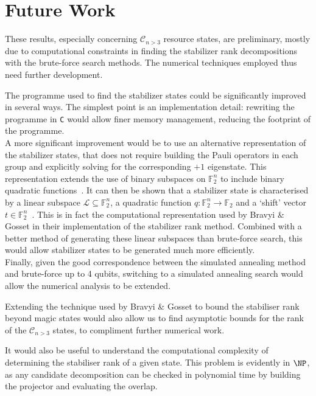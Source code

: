\documentclass{standalone}
\begin{document}
\section*{Future Work}
These results, especially concerning $\mathcal{C}_{n>3}$ resource states, are preliminary, mostly due to computational constraints in finding the stabilizer rank decompositions with the brute-force search methods. The numerical techniques employed thus need further development. 
\par
The programme used to find the stabilizer states could be significantly improved in several ways. The simplest point is an implementation detail: rewriting the programme in \texttt{C} would allow finer memory management, reducing the footprint of the programme. \\
A more significant improvement would be to use an alternative representation of the stabilizer states, that does not require building the Pauli operators in each group and explicitly solving for the corresponding $+1$ eigenstate. This representation extends the use of binary subspaces on $\mathbb{F}_{2}^{n}$ to include binary quadratic functions~\cite{Dehaene2003}. It can then be shown that a stabilizer state is characterised by a linear subspace $\mathcal{L}\subseteq \mathbb{F}_{2}^{n}$, a quadratic function $q:\mathbb{F}_{2}^{n}\rightarrow\mathbb{F}_{2}$ and a `shift' vector $t\in\mathbb{F}_{2}^{n}$~\cite{Dehaene2003,Gross2007}. This is in fact the computational representation used by Bravyi \& Gosset in their implementation of the stabilizer rank method. Combined with a better method of generating these linear subspaces than brute-force search, this would allow stabilizer states to be generated much more efficiently. \\
Finally, given the good correspondence between the simulated annealing method and brute-force up to 4 qubits, switching to a simulated annealing search would allow the numerical analysis to be extended. 
\par
Extending the technique used by Bravyi \& Gosset to bound the stabiliser rank beyond magic states would also allow us to find asymptotic bounds for the rank of the $\mathcal{C}_{n>3}$ states, to compliment further numerical work. 
\par
It would also be useful to understand the computational complexity of determining the stabiliser rank of a given state. This problem is evidently in $\NP$, as any candidate decomposition can be checked in polynomial time by building the projector and evaluating the overlap. \\
\end{document}
